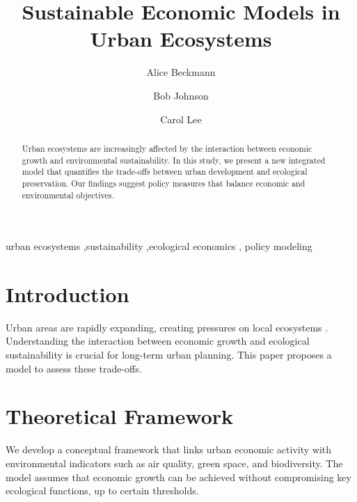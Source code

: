 \documentclass[
  authoryear,
  5p,
  twocolumn]{elsarticle}
\begin{document}
\begin{frontmatter}
\title{Sustainable Economic Models in Urban Ecosystems}
\author[1]{Alice Beckmann%
%
}
\author[2]{Bob Johnson%
%
}
\author[1]{Carol Lee%
%
}





        
\begin{abstract}
Urban ecosystems are increasingly affected by the interaction between
economic growth and environmental sustainability. In this study, we
present a new integrated model that quantifies the trade-offs between
urban development and ecological preservation. Our findings suggest
policy measures that balance economic and environmental objectives.
\end{abstract}





\begin{keyword}
    urban ecosystems \sep sustainability \sep ecological economics \sep 
    policy modeling
\end{keyword}
\end{frontmatter}
    

\section{Introduction}\label{introduction}

Urban areas are rapidly expanding, creating pressures on local
ecosystems \citep{knuth84}. Understanding the interaction between
economic growth and ecological sustainability is crucial for long-term
urban planning. This paper proposes a model to assess these trade-offs.

\section{Theoretical Framework}\label{theoretical-framework}

We develop a conceptual framework that links urban economic activity
with environmental indicators such as air quality, green space, and
biodiversity. The model assumes that economic growth can be achieved
without compromising key ecological functions, up to certain thresholds.
\end{document}
